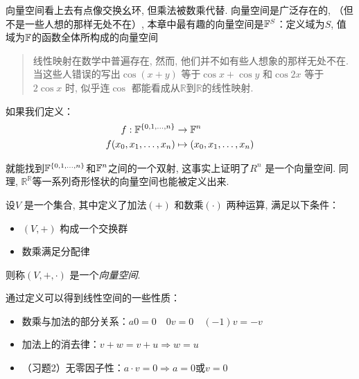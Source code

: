 向量空间看上去有点像交换幺环, 但乘法被数乘代替.
向量空间是广泛存在的, （但不是一些人想的那样无处不在）,
本章中最有趣的向量空间是\(\mathbb{F}^{S}\)：定义域为\(S\),
值域为\(\mathbb{F}\)的函数全体所构成的向量空间
\begin{quote}
    线性映射在数学中普遍存在, 然而, 他们并不如有些人想象的那样无处不在.
    当这些人错误的写出\(\cos(x+y)\) 等于\(\cos x+\cos y\) 和\(\cos 2x\)
    等于 \(2\cos x\) 时, 似乎连\(\cos\)
    都能看成从\(\mathbb{R}\)到\(\mathbb{R}\)的线性映射.
\end{quote}
如果我们定义：
\[
    \begin{aligned}
        f: \mathbb{F}^{\{0,1,\dots,n\}} &\to \mathbb{F}^{n}\\
        f(x_{0}, x_{1}, \dots, x_{n}) &\mapsto (x_{0},
        x_{1}, \dots, x_{n})
    \end{aligned}
\]

就能找到\(\mathbb{F}^{\{0,1,\dots,n\}}\)和\(\mathbb{F}^{n}\)之间的一个双射,
这事实上证明了\(R^{n}\)
是一个向量空间.
同理, \(\mathbb{R}^{\mathbb{R}}\)等一系列奇形怪状的向量空间也能被定义出来.
\begin{definition}
    设\(V\) 是一个集合, 其中定义了加法\((+)\) 和数乘\((\cdot)\) 两种运算, 满足以下条件：
    \begin{itemize}
        \item \((V, +)\) 构成一个交换群
        \item 数乘满足分配律
    \end{itemize}
    则称\((V, +, \cdot)\) 是一个\emph{向量空间}.
\end{definition}

通过定义可以得到线性空间的一些性质：
\begin{itemize}
    \item 数乘与加法的部分关系：\(a0=0\quad 0v=0\quad (-1)v=-v\)
    \item 加法上的消去律：\(v+w=v+u \Rightarrow w=u \)
    \item （习题2）无零因子性：\(a\cdot v=0 \Rightarrow a=0
        \text{或} v=0\)
\end{itemize}

